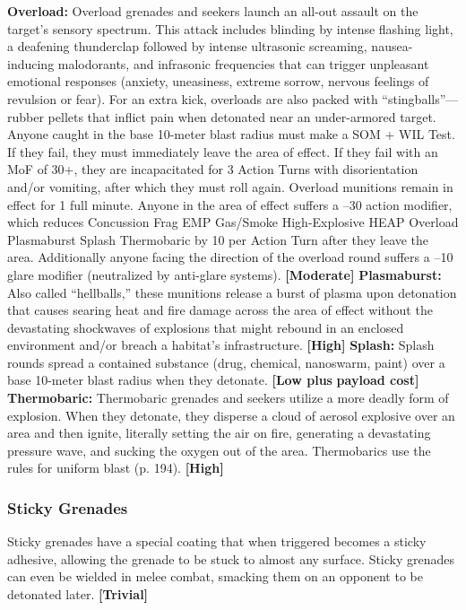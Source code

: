 \textbf{Overload:} Overload grenades and seekers launch an 
all-out assault on the target's sensory spectrum. This 
attack includes blinding by intense flashing light, a 
deafening thunderclap followed by intense ultrasonic 
screaming, nausea-inducing malodorants, and infrasonic
frequencies that can trigger unpleasant emotional
responses (anxiety, uneasiness, extreme sorrow, nervous
feelings of revulsion or fear). For an extra kick,
overloads are also packed with ``stingballs''—rubber 
pellets that inflict pain when detonated near an under-armored
target. Anyone caught in the base 10-meter
blast radius must make a SOM + WIL Test. If they fail, 
they must immediately leave the area of effect. If they 
fail with an MoF of 30+, they are incapacitated for 
3 Action Turns with disorientation and/or vomiting, 
after which they must roll again. Overload munitions 
remain in effect for 1 full minute. Anyone in the area 
of effect suffers a –30 action modifier, which reduces 
Concussion
Frag
EMP
Gas/Smoke
High-Explosive
HEAP
Overload
Plasmaburst
Splash
Thermobaric
by 10 per Action Turn after they leave the area. Additionally
anyone facing the direction of the overload
round suffers a –10 glare modifier (neutralized by 
anti-glare systems). \textbf{[Moderate]}
\textbf{Plasmaburst:} Also called ``hellballs,'' these munitions
release a burst of plasma upon detonation that
causes searing heat and fire damage across the area of 
effect without the devastating shockwaves of explosions
that might rebound in an enclosed environment
and/or breach a habitat's infrastructure. \textbf{[High]}
\textbf{Splash:} Splash rounds spread a contained substance 
(drug, chemical, nanoswarm, paint) over a base 10-meter
blast radius when they detonate. \textbf{[Low plus }
\textbf{payload cost]}
\textbf{Thermobaric:} Thermobaric grenades and seekers 
utilize a more deadly form of explosion. When they 
detonate, they disperse a cloud of aerosol explosive 
over an area and then ignite, literally setting the air 
on fire, generating a devastating pressure wave, and 
sucking the oxygen out of the area. Thermobarics use 
the rules for uniform blast (p. 194). \textbf{[High]}

\subsubsection{Sticky Grenades}

Sticky grenades have a special coating that when triggered
becomes a sticky adhesive, allowing the grenade
to be stuck to almost any surface. Sticky grenades can 
even be wielded in melee combat, smacking them on 
an opponent to be detonated later. \textbf{[Trivial]}


